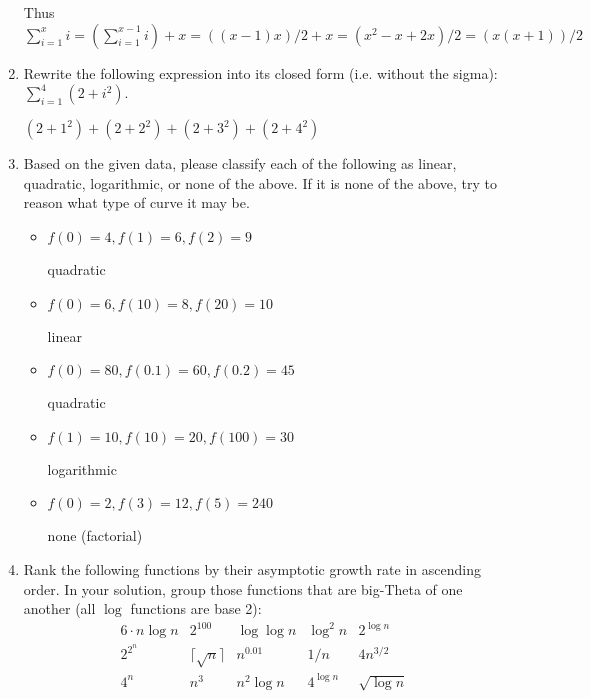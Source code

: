 \documentclass[11pt]{article}
\begin{document}
\begin{enumerate}[leftmargin=*]
Thus \( \sum\limits_{i=1}^x i = (\sum\limits_{i=1}^{x-1} i) + x = ((x-1)x)/2 + x = (x^2 - x + 2x)/2 = (x(x+1))/2 \)

\item Rewrite the following expression into its closed form (i.e. without the sigma): \( \sum_{i=1}^4 (2 + i^2) \).

\( (2 + 1^2) + (2 + 2^2) + (2 + 3^2) + (2 + 4^2) \)

\item Based on the given data, please classify each of the following as linear, quadratic, logarithmic, or none of the above. If it is none of the above, try to reason what type of curve it may be.
\begin{itemize}
    \item $f(0) = 4, f(1) = 6, f(2) = 9$
    
    quadratic
    \item $f(0) = 6, f(10) = 8, f(20) = 10$
    
    linear
    \item $f(0) = 80, f(0.1) = 60, f(0.2) = 45$
    
    quadratic
    \item $f(1) = 10, f(10) = 20, f(100) = 30$
    
    logarithmic
    \item $f(0) = 2, f(3) = 12, f(5) = 240$
    
    none (factorial)
    
\end{itemize}

\item Rank the following functions by their asymptotic growth rate in ascending order.  In your solution, group those functions that are big-Theta of one another (all $\log$ functions are base 2):
    \begin{equation*}
        \begin{array}{ccccc}
            6 \cdot n\log n & 2^{100} & \log \log n & \log^2 n & 2^{\log n} \\
            2^{2^n} & \lceil\sqrt{n}\rceil & n^{0.01} & 1/n & 4n^{3/2} \\
            4^n & n^3 & n^2\log n & 4^{\log n} & \sqrt{\log n} \\
        \end{array}
    \end{equation*}
    

\end{enumerate}
\end{document}
